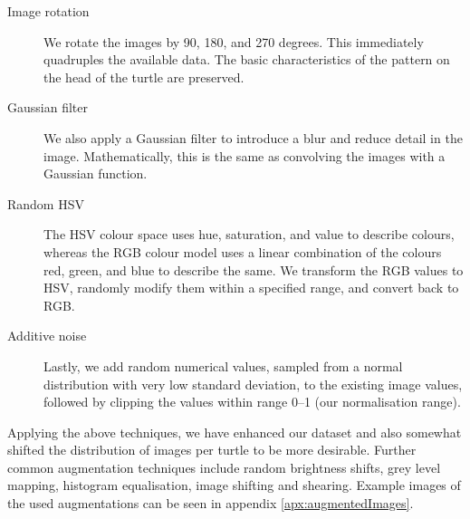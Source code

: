 \begin{description}
    \item[Image rotation] We rotate the images by 90, 180, and 270 degrees. This immediately quadruples the available data. The basic characteristics of the pattern on the head of the turtle are preserved.
    \item[Gaussian filter] We also apply a Gaussian filter to introduce a blur and reduce detail in the image. Mathematically, this is the same as convolving the images with a Gaussian function.
    \item[Random HSV] The HSV colour space uses hue, saturation, and value to describe colours, whereas the RGB colour model uses a linear combination of the colours red, green, and blue to describe the same. We transform the RGB values to HSV, randomly modify them within a specified range, and convert back to RGB.
    \item[Additive noise] Lastly, we add random numerical values, sampled from a normal distribution with very low standard deviation, to the existing image values, followed by clipping the values within range \numrange{0}{1} (our normalisation range).
\end{description}

Applying the above techniques, we have enhanced our dataset and also somewhat shifted the distribution of images per turtle to be more desirable. Further common augmentation techniques include random brightness shifts, grey level mapping, histogram equalisation, image shifting and shearing. Example images of the used augmentations can be seen in appendix \ref{apx:augmentedImages}.